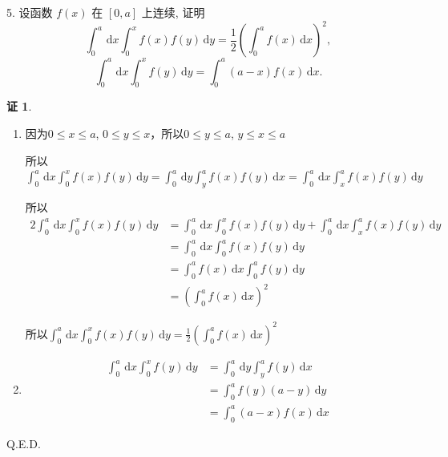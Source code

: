 \documentclass[a4paper,12pt]{article}
\theoremstyle{definition}
\newtheorem*{pf}{证}
\begin{document}
5. 设函数 $f(x)$ 在 $[0,a]$ 上连续, 证明
$$\int_{0}^{a}\,\mathrm{d}x \int_{0}^{x} f(x)f(y)\,\mathrm{d}y = \frac{1}{2}\left( \int_{0}^{a} f(x)\,\mathrm{d}x \right)^2,$$
$$\int_{0}^{a} \,\mathrm{d}x \int_{0}^{x} f(y) \,\mathrm{d}y = \int_{0}^{a} (a-x)f(x) \,\mathrm{d}x.$$
\begin{pf}
    \begin{enumerate}
        \item 因为$0\leq x\leq a$, $0\leq y\leq x$，所以$0\leq y\leq a$, $y\leq x\leq a$

              所以$\int_{0}^{a}\,\mathrm{d}x \int_{0}^{x} f(x)f(y)\,\mathrm{d}y=\int_{0}^{a}\,\mathrm{d}y \int_{y}^{a} f(x)f(y)\,\mathrm{d}x=\int_{0}^{a}\,\mathrm{d}x \int_{x}^{a} f(x)f(y)\,\mathrm{d}y$

              所以\begin{align*}
                  2\int_{0}^{a}\,\mathrm{d}x \int_{0}^{x} f(x)f(y)\,\mathrm{d}y
                   & =\int_{0}^{a}\,\mathrm{d}x \int_{0}^{x} f(x)f(y)\,\mathrm{d}y+\int_{0}^{a}\,\mathrm{d}x \int_{x}^{a} f(x)f(y)\,\mathrm{d}y \\
                   & =\int_{0}^{a}\,\mathrm{d}x \int_{0}^{a} f(x)f(y)\,\mathrm{d}y                                                              \\
                   & =\int_{0}^{a}f(x)\,\mathrm{d}x \int_{0}^{a} f(y)\,\mathrm{d}y                                                              \\
                   & =(\int_{0}^{a} f(x)\,\mathrm{d}x)^2
              \end{align*}

              所以$\int_{0}^{a}\,\mathrm{d}x \int_{0}^{x} f(x)f(y)\,\mathrm{d}y = \frac{1}{2}\left( \int_{0}^{a} f(x)\,\mathrm{d}x \right)^2$
        \item \begin{align*}
                  \int_{0}^{a} \,\mathrm{d}x \int_{0}^{x} f(y) \,\mathrm{d}y
                   & =\int_{0}^{a} \,\mathrm{d}y \int_{y}^{a} f(y) \,\mathrm{d}x \\
                   & =\int_0^a f(y)(a-y)\,\mathrm{d}y                            \\
                   & =\int_{0}^{a} (a-x)f(x) \,\mathrm{d}x
              \end{align*}
    \end{enumerate}

    Q.E.D.
\end{pf}
\end{document}
